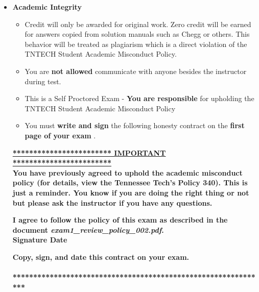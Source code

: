 \documentclass[11pt]{article}
\newcommand{\EXAMNUM}{1\hspace{0mm}}
\newcommand{\SECNUM}{002\hspace{0mm}}
\begin{document}
\begin{itemize}
\begin{itemize}
	\end{itemize}

\newpage
		\item  \textbf{ \Large Academic Integrity}
\begin{itemize}

		\item {\B Credit will only be awarded for original work. Zero credit will be earned for answers copied from solution manuals such as Chegg or others. This behavior will be treated as plagiarism which is a direct violation of the TNTECH Student Academic Misconduct Policy.}

		\item  You are {\bf not allowed} communicate with anyone besides the instructor during test. 
		\item This is a Self Proctored Exam - {\bf You are responsible} for upholding the TNTECH Student Academic Misconduct Policy
		\item  You must {\bf write and sign} the following honesty contract on the {\bf first page of your exam }. 
		
		

\end{itemize}


 {\R  \bf \underline{************************ IMPORTANT ************************}} \vspace{3mm}\\
			  {\R \bf You have previously agreed to uphold the academic misconduct policy (for details, view the
Tennessee Tech's Policy 340). This is just a reminder. You know if you are doing the right thing or not but please ask the instructor if you have any questions. }
\begin{framed}
	
	\vspace{3mm}	 \textbf{ I \underline{\hspace{50mm}} agree to follow the policy of this exam \vspc as described in the document {\it exam\EXAMNUM\_review\_policy\_\SECNUM.pdf}.  }\vspace{3mm}\\
		 \textbf{\Large Signature \underline{\hspace{80mm}} Date\underline{\hspace{20mm} }}\\

\end{framed}
			{\R  \bf Copy, sign, and date this contract on your exam. }   \vspace{1mm}\\
			{\R  \bf \underline{\hspace{140mm}}} \\
			{\R  \bf ***************************************************************} 


\end{itemize}
\end{document}
